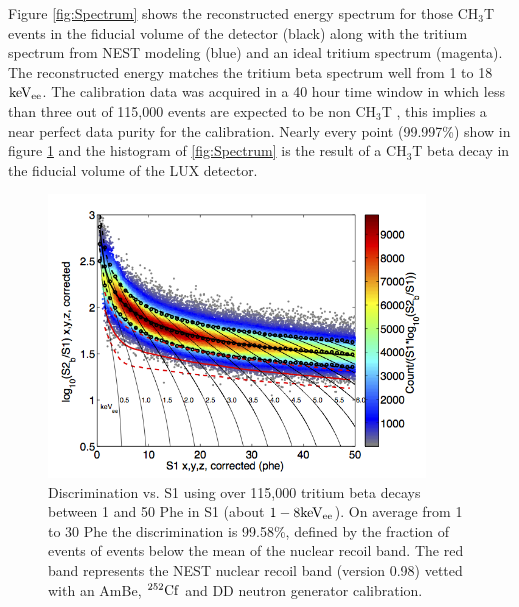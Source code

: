 Figure \ref{fig:Spectrum} shows the reconstructed energy spectrum for those CH$_3$T events in the fiducial volume of the detector (black) along with the tritium spectrum from NEST modeling (blue) and an ideal tritium spectrum (magenta). The reconstructed energy matches the tritium beta spectrum well from 1 to 18 $\rm keV_{ee}$.
The calibration data was acquired in a 40 hour time window in which less than three out of 115,000 events are expected to be non CH$_3$T \cite{LUX_BG}, this implies a near perfect data purity for the calibration. Nearly every point (99.997\%) show in figure \ref{fig:Band} and the histogram of \ref{fig:Spectrum} is the result of a CH$_3$T beta decay in the fiducial volume of the LUX detector.

\begin{figure}[h!]\centering
\includegraphics[width=100mm]{fig/CH3T_fid_50_2_Dec_Tritium_Approval_Plots.png}
\caption{Discrimination vs. S1 using over 115,000 tritium beta decays between 1 and 50 Phe in S1 (about $\rm1-8 keV_{ee}$). On average from 1 to 30 Phe the discrimination is 99.58\%, defined by the fraction of events of events below the mean of the nuclear recoil band. The red band represents the NEST nuclear recoil band (version 0.98) vetted with an AmBe, $\rm^{252}Cf$ and DD neutron generator calibration.}
\label{fig:Band}
\end{figure}


